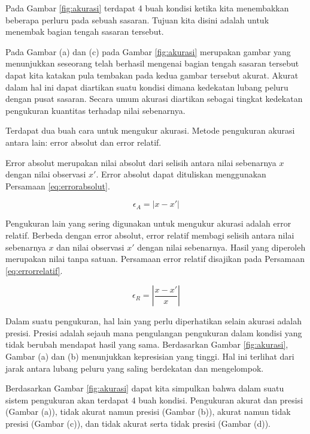 \documentclass[
]{book}
\theoremstyle{definition}
\theoremstyle{definition}
\theoremstyle{definition}
\theoremstyle{definition}
\theoremstyle{remark}
\begin{document}
Pada Gambar \ref{fig:akurasi} terdapat 4 buah kondisi ketika kita menembakkan beberapa perluru pada sebuah sasaran. Tujuan kita disini adalah untuk menembak bagian tengah sasaran tersebut.

Pada Gambar (a) dan (c) pada Gambar \ref{fig:akurasi} merupakan gambar yang menunjukkan seseorang telah berhasil mengenai bagian tengah sasaran tersebut dapat kita katakan pula tembakan pada kedua gambar tersebut akurat. Akurat dalam hal ini dapat diartikan suatu kondisi dimana kedekatan lubang peluru dengan pusat sasaran. Secara umum akurasi diartikan sebagai tingkat kedekatan pengukuran kuantitas terhadap nilai sebenarnya.

Terdapat dua buah cara untuk mengukur akurasi. Metode pengukuran akurasi antara lain: error absolut dan error relatif.

Error absolut merupakan nilai absolut dari selisih antara nilai sebenarnya \(x\) dengan nilai observasi \(x'\). Error absolut dapat dituliskan menggunakan Persamaan \eqref{eq:errorabsolut}.

\begin{equation}
   \epsilon_A=\left|x-x'\right|
  \label{eq:errorabsolut}
\end{equation}

Pengukuran lain yang sering digunakan untuk mengukur akurasi adalah error relatif. Berbeda dengan error absolut, error relatif membagi selisih antara nilai sebenarnya \(x\) dan nilai observasi \(x'\) dengan nilai sebenarnya. Hasil yang diperoleh merupakan nilai tanpa satuan. Persamaan error relatif disajikan pada Persamaan \eqref{eq:errorrelatif}.

\begin{equation}
   \epsilon_R=\left|\frac{x-x'}{x}\right|
  \label{eq:errorrelatif}
\end{equation}

Dalam suatu pengukuran, hal lain yang perlu diperhatikan selain akurasi adalah presisi. Presisi adalah sejauh mana pengulangan pengukuran dalam kondisi yang tidak berubah mendapat hasil yang sama. Berdasarkan Gambar \ref{fig:akurasi}, Gambar (a) dan (b) menunjukkan kepresisian yang tinggi. Hal ini terlihat dari jarak antara lubang peluru yang saling berdekatan dan mengelompok.

Berdasarkan Gambar \ref{fig:akurasi} dapat kita simpulkan bahwa dalam suatu sistem pengukuran akan terdapat 4 buah kondisi. Pengukuran akurat dan presisi (Gambar (a)), tidak akurat namun presisi (Gambar (b)), akurat namun tidak presisi (Gambar (c)), dan tidak akurat serta tidak presisi (Gambar (d)).
\end{document}
